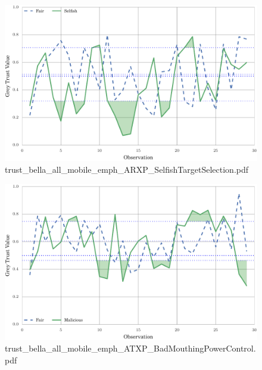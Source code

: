 \documentclass{article}
\begin{document}
\begin{figure}[h!]
\centering
\includegraphics[width=\linewidth]{trust_bella_all_mobile_emph_ARXP_SelfishTargetSelection.pdf}
\caption{trust\_bella\_all\_mobile\_emph\_ARXP\_SelfishTargetSelection.pdf}
\end{figure}




\begin{figure}[h!]
\centering
\includegraphics[width=\linewidth]{trust_bella_all_mobile_emph_ATXP_BadMouthingPowerControl.pdf}
\caption{trust\_bella\_all\_mobile\_emph\_ATXP\_BadMouthingPowerControl.pdf}
\end{figure}
\end{document}
